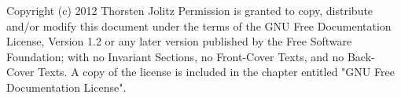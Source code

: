 \begin{titlepage}
\end{titlepage}

\newpage



\vspace{13.5cm}

\begin{wideverbatim}
  Copyright (c)  2012  Thorsten Jolitz
  Permission is granted to copy, distribute and/or modify this document
  under the terms of the GNU Free Documentation License, Version 1.2
  or any later version published by the Free Software Foundation;
  with no Invariant Sections, no Front-Cover Texts, and no Back-Cover
  Texts.  A copy of the license is included in the chapter entitled "GNU
  Free Documentation License".
\end{wideverbatim}


